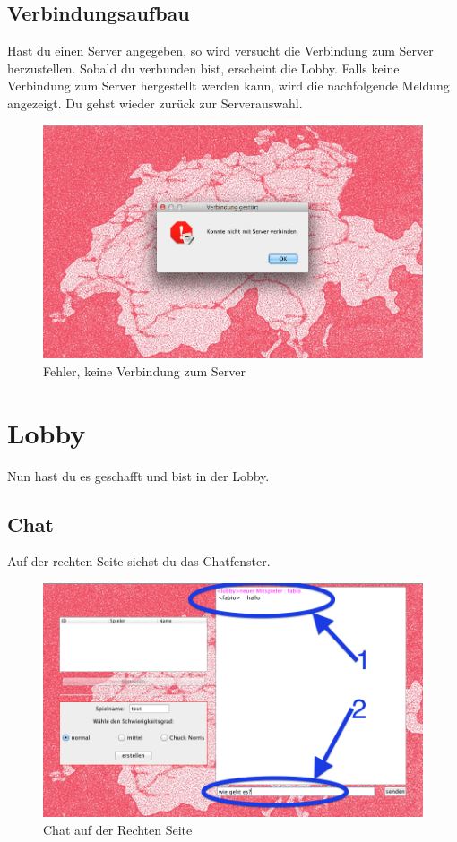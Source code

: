 \documentclass[ngerman, 12pt, pdftex]{scrartcl}[2006/07/30]
\begin{document}
\subsection{Verbindungsaufbau}
Hast du einen Server angegeben, so wird versucht die Verbindung zum Server herzustellen. Sobald du verbunden bist, erscheint die Lobby.
Falls keine Verbindung zum Server hergestellt werden kann,  wird die nachfolgende Meldung angezeigt. Du gehst wieder zurück zur Serverauswahl.
\begin{figure}[h]
\centering
\includegraphics[scale=0.3]{starten/keine_serververbindung.png}
\caption{Fehler, keine Verbindung zum Server}
\end{figure}




\newpage

\section{Lobby}

Nun hast du es geschafft und bist in der Lobby.
\subsection{Chat}
Auf der rechten Seite siehst du das Chatfenster.
\begin{figure}[h]
\centering
\includegraphics[scale=0.3]{lobby/chat.png}
\caption{Chat auf der Rechten Seite}
\end{figure}
\end{document}
